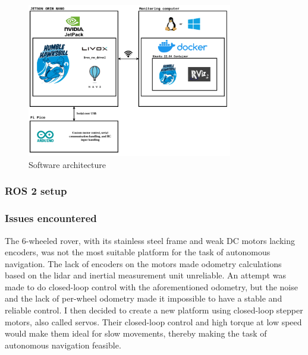 \documentclass[11pt]{article}
\begin{document}
            \begin{figure}[H]
                \centering
                \includegraphics[width=0.8\textwidth]{Images/Software architecture rover.drawio.png}
                \caption{Software architecture}
                \label{fig:SW_architecture}
            \end{figure}


            \subsubsection{ROS 2 setup}
            
            

            \subsubsection{Issues encountered}
                

            The 6-wheeled rover, with its stainless steel frame and weak DC motors lacking encoders, was not the most suitable platform for the task of autonomous navigation. The lack of encoders on the motors made odometry calculations based on the lidar and inertial measurement unit unreliable. An attempt was made to do closed-loop control with the aforementioned odometry, but the noise and the lack of per-wheel odometry made it impossible to have a stable and reliable control. I then decided to create a new platform using closed-loop stepper motors, also called servos. Their closed-loop control and high torque at low speed would make them ideal for slow movements, thereby making the task of autonomous navigation feasible.
\end{document}
